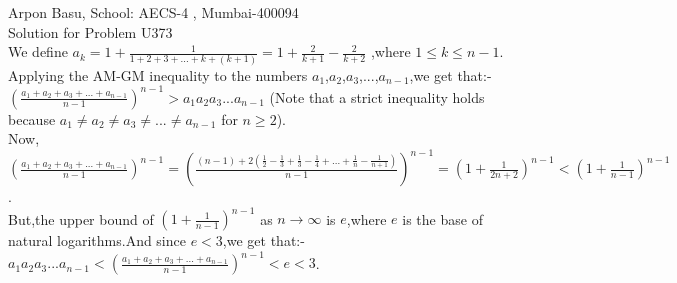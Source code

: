 \documentclass[10pt,a4paper]{extarticle}
\begin{document}
 
Arpon Basu, School: AECS-4 , Mumbai-400094\\
 
Solution for Problem U373 \\

We define $a_{k}=1+\frac{1}{1+2+3+...+k+(k+1)}=1+\frac{2}{k+1}-\frac{2}{k+2}$ ,where  $1\leq k\leq n-1$.\\

Applying the AM-GM inequality to the numbers $a_{1}$,$a_{2}$,$a_{3}$,...,$a_{n-1}$,we get that:-\\
$(\frac{a_{1}+a_{2}+a_{3}+...+a_{n-1}}{n-1})^{n-1} > a_{1}a_{2}a_{3}...a_{n-1}$ (Note that a strict inequality holds because $a_{1}\neq a_{2}\neq a_{3}\neq ... \neq a_{n-1}$ for $n\geq 2$).\\
Now,
$(\frac{a_{1}+a_{2}+a_{3}+...+a_{n-1}}{n-1})^{n-1}=(\frac{(n-1)+2(\frac{1}{2}-\frac{1}{3}+\frac{1}{3}-\frac{1}{4}+...+\frac{1}{n}-\frac{1}{n+1})}{n-1})^{n-1}=(1+\frac{1}{2n+2})^{n-1}< (1+\frac{1}{n-1})^{n-1}$.\\
But,the upper bound of $(1+\frac{1}{n-1})^{n-1}$ as $n\rightarrow \infty $ is $e$,where $e$ is the base of natural logarithms.And since $e<3$,we get that:-\\
$a_{1}a_{2}a_{3}...a_{n-1}<(\frac{a_{1}+a_{2}+a_{3}+...+a_{n-1}}{n-1})^{n-1}<e<3$.\\ 

 
\end{document}
